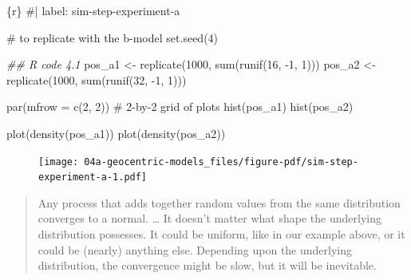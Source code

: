 \documentclass[
  letterpaper,
  DIV=11,
  numbers=noendperiod]{scrreprt}
\newenvironment{Shaded}{\begin{snugshade}}{\end{snugshade}}
\newcommand{\AttributeTok}[1]{\textcolor[rgb]{0.40,0.45,0.13}{#1}}
\newcommand{\CommentTok}[1]{\textcolor[rgb]{0.37,0.37,0.37}{#1}}
\newcommand{\DecValTok}[1]{\textcolor[rgb]{0.68,0.00,0.00}{#1}}
\newcommand{\DocumentationTok}[1]{\textcolor[rgb]{0.37,0.37,0.37}{\textit{#1}}}
\newcommand{\FunctionTok}[1]{\textcolor[rgb]{0.28,0.35,0.67}{#1}}
\newcommand{\InformationTok}[1]{\textcolor[rgb]{0.37,0.37,0.37}{#1}}
\newcommand{\NormalTok}[1]{\textcolor[rgb]{0.00,0.23,0.31}{#1}}
\newcommand{\OtherTok}[1]{\textcolor[rgb]{0.00,0.23,0.31}{#1}}
\newcommand{\SpecialCharTok}[1]{\textcolor[rgb]{0.37,0.37,0.37}{#1}}
\begin{document}
\begin{Shaded}
\begin{Highlighting}[]
\InformationTok{\textasciigrave{}\textasciigrave{}\textasciigrave{}\{r\}}
\CommentTok{\#| label: sim{-}step{-}experiment{-}a}

\CommentTok{\# to replicate with the b{-}model}
\FunctionTok{set.seed}\NormalTok{(}\DecValTok{4}\NormalTok{)}

\DocumentationTok{\#\# R code 4.1}
\NormalTok{pos\_a1 }\OtherTok{\textless{}{-}} \FunctionTok{replicate}\NormalTok{(}\DecValTok{1000}\NormalTok{, }\FunctionTok{sum}\NormalTok{(}\FunctionTok{runif}\NormalTok{(}\DecValTok{16}\NormalTok{, }\SpecialCharTok{{-}}\DecValTok{1}\NormalTok{, }\DecValTok{1}\NormalTok{)))}
\NormalTok{pos\_a2 }\OtherTok{\textless{}{-}} \FunctionTok{replicate}\NormalTok{(}\DecValTok{1000}\NormalTok{, }\FunctionTok{sum}\NormalTok{(}\FunctionTok{runif}\NormalTok{(}\DecValTok{32}\NormalTok{, }\SpecialCharTok{{-}}\DecValTok{1}\NormalTok{, }\DecValTok{1}\NormalTok{)))}

\FunctionTok{par}\NormalTok{(}\AttributeTok{mfrow =} \FunctionTok{c}\NormalTok{(}\DecValTok{2}\NormalTok{, }\DecValTok{2}\NormalTok{)) }\CommentTok{\# 2{-}by{-}2 grid of plots}
\FunctionTok{hist}\NormalTok{(pos\_a1)}
\FunctionTok{hist}\NormalTok{(pos\_a2)}

\FunctionTok{plot}\NormalTok{(}\FunctionTok{density}\NormalTok{(pos\_a1))}
\FunctionTok{plot}\NormalTok{(}\FunctionTok{density}\NormalTok{(pos\_a2))}
\InformationTok{\textasciigrave{}\textasciigrave{}\textasciigrave{}}
\end{Highlighting}
\end{Shaded}

\begin{figure}[H]

{\centering \texttt{[image: 04a-geocentric-models\_files/figure-pdf/sim-step-experiment-a-1.pdf]}

}

\end{figure}

\begin{quote}
Any process that adds together random values from the same distribution
converges to a normal. \ldots{} It doesn't matter what shape the
underlying distribution possesses. It could be uniform, like in our
example above, or it could be (nearly) anything else. Depending upon the
underlying distribution, the convergence might be slow, but it will be
inevitable.
\end{quote}
\end{document}

